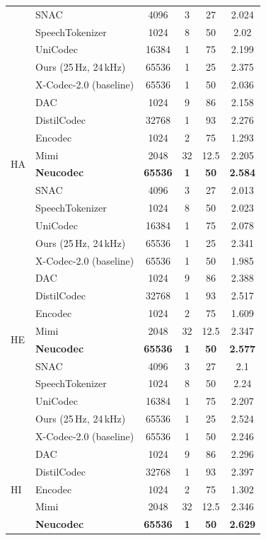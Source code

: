 \documentclass[preprint]{article}
\begin{document}
\begin{longtable}{llcccc}
  & SNAC & 4096 & 3 & 27 & 2.024 \\
  & SpeechTokenizer & 1024 & 8 & 50 & 2.02 \\
  & UniCodec & 16384 & 1 & 75 & 2.199 \\
  & Ours (25\,Hz, 24\,kHz) & 65536 & 1 & 25 & 2.375 \\
  & X-Codec-2.0 (baseline) & 65536 & 1 & 50 & 2.036 \\
\midrule
\multirow{8}{*}{HA}
  & DAC & 1024 & 9 & 86 & 2.158 \\
  & DistilCodec & 32768 & 1 & 93 & 2.276 \\
  & Encodec & 1024 & 2 & 75 & 1.293 \\
  & Mimi & 2048 & 32 & 12.5 & 2.205 \\
  & \textbf{Neucodec} & \textbf{65536} & \textbf{1} & \textbf{50} & \textbf{2.584} \\
  & SNAC & 4096 & 3 & 27 & 2.013 \\
  & SpeechTokenizer & 1024 & 8 & 50 & 2.023 \\
  & UniCodec & 16384 & 1 & 75 & 2.078 \\
  & Ours (25\,Hz, 24\,kHz) & 65536 & 1 & 25 & 2.341 \\
  & X-Codec-2.0 (baseline) & 65536 & 1 & 50 & 1.985 \\
\midrule
\multirow{8}{*}{HE}
  & DAC & 1024 & 9 & 86 & 2.388 \\
  & DistilCodec & 32768 & 1 & 93 & 2.517 \\
  & Encodec & 1024 & 2 & 75 & 1.609 \\
  & Mimi & 2048 & 32 & 12.5 & 2.347 \\
  & \textbf{Neucodec} & \textbf{65536} & \textbf{1} & \textbf{50} & \textbf{2.577} \\
  & SNAC & 4096 & 3 & 27 & 2.1 \\
  & SpeechTokenizer & 1024 & 8 & 50 & 2.24 \\
  & UniCodec & 16384 & 1 & 75 & 2.207 \\
  & Ours (25\,Hz, 24\,kHz) & 65536 & 1 & 25 & 2.524 \\
  & X-Codec-2.0 (baseline) & 65536 & 1 & 50 & 2.246 \\
\midrule
\multirow{8}{*}{HI}
  & DAC & 1024 & 9 & 86 & 2.296 \\
  & DistilCodec & 32768 & 1 & 93 & 2.397 \\
  & Encodec & 1024 & 2 & 75 & 1.302 \\
  & Mimi & 2048 & 32 & 12.5 & 2.346 \\
  & \textbf{Neucodec} & \textbf{65536} & \textbf{1} & \textbf{50} & \textbf{2.629} \\

\end{longtable}
\end{document}
